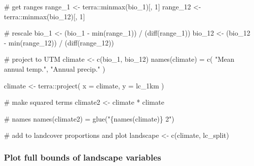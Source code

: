 \documentclass[
]{article}
\newenvironment{Shaded}{}{}
\newcommand{\CommentTok}[1]{\textcolor[rgb]{0.00,0.50,0.00}{#1}}
\newcommand{\DataTypeTok}[1]{#1}
\newcommand{\DecValTok}[1]{#1}
\newcommand{\KeywordTok}[1]{\textcolor[rgb]{0.00,0.00,1.00}{#1}}
\newcommand{\NormalTok}[1]{#1}
\newcommand{\OperatorTok}[1]{#1}
\newcommand{\StringTok}[1]{\textcolor[rgb]{0.00,0.50,0.50}{#1}}
\begin{document}
\begin{Shaded}
\begin{Highlighting}[]
\CommentTok{# get ranges}
\NormalTok{range_}\DecValTok{1}\NormalTok{ <-}\StringTok{ }\NormalTok{terra}\OperatorTok{::}\KeywordTok{minmax}\NormalTok{(bio_}\DecValTok{1}\NormalTok{)[, }\DecValTok{1}\NormalTok{] }
\NormalTok{range_}\DecValTok{12}\NormalTok{ <-}\StringTok{ }\NormalTok{terra}\OperatorTok{::}\KeywordTok{minmax}\NormalTok{(bio_}\DecValTok{12}\NormalTok{)[, }\DecValTok{1}\NormalTok{]}

\CommentTok{# rescale}
\NormalTok{bio_}\DecValTok{1}\NormalTok{ <-}\StringTok{ }\NormalTok{(bio_}\DecValTok{1} \OperatorTok{-}\StringTok{ }\KeywordTok{min}\NormalTok{(range_}\DecValTok{1}\NormalTok{)) }\OperatorTok{/}\StringTok{ }\NormalTok{(}\KeywordTok{diff}\NormalTok{(range_}\DecValTok{1}\NormalTok{))}
\NormalTok{bio_}\DecValTok{12}\NormalTok{ <-}\StringTok{ }\NormalTok{(bio_}\DecValTok{12} \OperatorTok{-}\StringTok{ }\KeywordTok{min}\NormalTok{(range_}\DecValTok{12}\NormalTok{)) }\OperatorTok{/}\StringTok{ }\NormalTok{(}\KeywordTok{diff}\NormalTok{(range_}\DecValTok{12}\NormalTok{))}

\CommentTok{# project to UTM}
\NormalTok{climate <-}\StringTok{ }\KeywordTok{c}\NormalTok{(bio_}\DecValTok{1}\NormalTok{, bio_}\DecValTok{12}\NormalTok{)}
\KeywordTok{names}\NormalTok{(climate) =}\StringTok{ }\KeywordTok{c}\NormalTok{(}
  \StringTok{"Mean annual temp."}\NormalTok{, }
  \StringTok{"Annual precip."}
\NormalTok{)}

\NormalTok{climate <-}\StringTok{ }\NormalTok{terra}\OperatorTok{::}\KeywordTok{project}\NormalTok{(}
  \DataTypeTok{x =}\NormalTok{ climate, }\DataTypeTok{y =}\NormalTok{ lc_1km}
\NormalTok{)}

\CommentTok{# make squared terms}
\NormalTok{climate2 <-}\StringTok{ }\NormalTok{climate }\OperatorTok{*}\StringTok{ }\NormalTok{climate}

\CommentTok{# names}
\KeywordTok{names}\NormalTok{(climate2) =}\StringTok{ }\KeywordTok{glue}\NormalTok{(}\StringTok{"\{names(climate)\} 2"}\NormalTok{)}

\CommentTok{# add to landcover proportions and plot}
\NormalTok{landscape <-}\StringTok{ }\KeywordTok{c}\NormalTok{(climate, lc_split)}
\end{Highlighting}
\end{Shaded}

\hypertarget{plot-full-bounds-of-landscape-variables}{%
\subsubsection{Plot full bounds of landscape variables}\label{plot-full-bounds-of-landscape-variables}}
\end{document}
